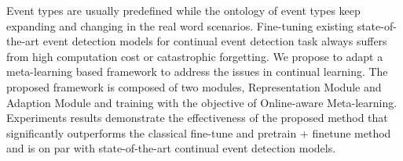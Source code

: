 Event types are usually predefined while the ontology of event types keep expanding and changing in the real word scenarios. Fine-tuning existing state-of-the-art event detection models for continual event detection task always suffers from high computation cost or catastrophic forgetting. We propose to adapt a meta-learning based framework to address the issues in continual learning. The proposed framework is composed of two modules, Representation Module and Adaption Module and training with the objective of Online-aware Meta-learning. Experiments results demonstrate the effectiveness of the proposed method that significantly outperforms the classical fine-tune and pretrain + finetune method and is on par with state-of-the-art continual event detection models. 